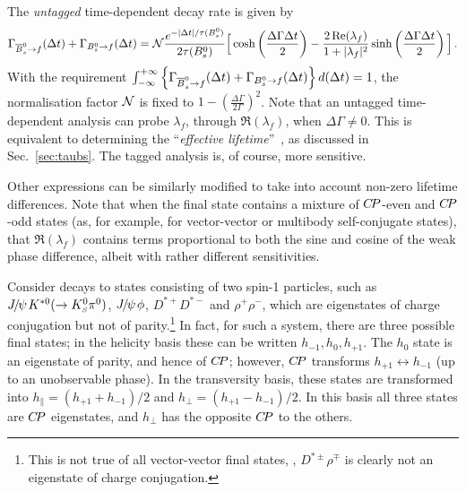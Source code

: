 The {\it untagged} time-dependent decay rate is given by
\begin{equation}
  \Gamma_{\Bsbar \to f} (\Delta t) + \Gamma_{\Bs \to f} (\Delta t)
  = 
  {\cal N} %
  \frac{e^{-| \Delta t | / \tau(\Bs)}}{2\tau(\Bs)}
  \Big[ 
  \cosh\left(\frac{\Delta \Gamma \Delta t}{2}\right) -
  \frac{2\, \Re(\lambda_f)}{1 + |\lambda_f|^2} \sinh\left(\frac{\Delta \Gamma \Delta t}{2}\right)
  \Big] \, .
\end{equation}
With the requirement
$\int_{-\infty}^{+\infty} \left\{ 
  \Gamma_{\Bsbar \to f} (\Delta t) + \Gamma_{\Bs \to f} (\Delta t)
\right\} d(\Delta t) = 1$,
the normalisation factor ${\cal N}$ 
is fixed to $1 - (\frac{\Delta \Gamma}{2\Gamma})^2$.
Note that an untagged time-dependent analysis can probe
$\lambda_f$, through $\Re(\lambda_f)$, when $\Delta \Gamma \neq 0$.
This is equivalent to determining the ``{\it effective lifetime}''~\cite{Fleischer:2011cw}, as discussed in Sec.~\ref{sec:taubs}.
The tagged analysis is, of course, more sensitive.

Other expressions can be similarly modified to take into account 
non-zero lifetime differences.
Note that when the final state contains 
a mixture of $C\!P$-even and $C\!P$-odd states
(as, for example, for vector-vector or multibody self-conjugate states),
that $\Re(\lambda_f)$ contains terms proportional to 
both the sine and cosine of the weak phase difference, 
albeit with rather different sensitivities.

\label{sec:cp_uta:notations:vv}

Consider \B decays to states consisting of two spin-1 particles,
such as ${J\mskip -3mu/\mskip -2mu\psi\mskip 2mu} K^{*0}(\to K^0_{\scriptscriptstyle S}\pi^0)$, ${J\mskip -3mu/\mskip -2mu\psi\mskip 2mu}\phi$, $D^{*+}D^{*-}$ and $\rho^+\rho^-$,
which are eigenstates of charge conjugation but not of parity.\footnote{
  \noindent
  This is not true of all vector-vector final states,
  \eg, $D^{*\pm}\rho^{\mp}$ is clearly not an eigenstate of 
  charge conjugation.
}
In fact, for such a system, there are three possible final states;
in the helicity basis these can be written $h_{-1}, h_0, h_{+1}$.
The $h_0$ state is an eigenstate of parity, and hence of $C\!P$;
however, $C\!P$ transforms $h_{+1} \leftrightarrow h_{-1}$ (up to 
an unobservable phase). In the transversity basis, these states 
are transformed into  $h_\parallel =  (h_{+1} + h_{-1})/2$ and 
$h_\perp = (h_{+1} - h_{-1})/2$.
In this basis all three states are $C\!P$ eigenstates, 
and $h_\perp$ has the opposite $C\!P$ to the others.

